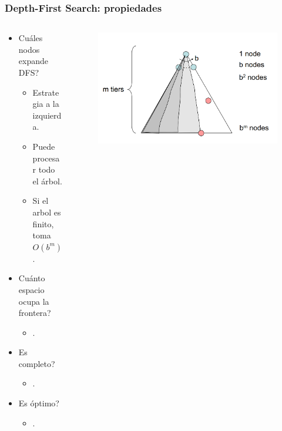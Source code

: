 \documentclass[10pt]{beamer}
\begin{document}
\begin{frame}
  \frametitle{Depth-First Search: propiedades}
  \begin{columns}
    \begin{column}{0.5\textwidth}
      \begin{itemize}
        \item Cuáles nodos expande DFS?
          \begin{itemize}
            \item Estrategia a la izquierda.
            \item Puede procesar todo el árbol.
            \item Si el arbol es finito, toma $O(b^m)$.
          \end{itemize}
        \item Cuánto espacio ocupa la frontera?
          \begin{itemize}
            \item .
          \end{itemize}
        \item Es completo?
          \begin{itemize}
            \item .
          \end{itemize}
        \item Es óptimo?
          \begin{itemize}
            \item .
          \end{itemize}
      \end{itemize}
    \end{column}
    \begin{column}{0.5\textwidth}
      \begin{figure}[!h] 
        \centering
        \includegraphics[width=1\textwidth]{img/dfs2}
      \end{figure} 
    \end{column}
  \end{columns}
\end{frame}
\end{document}
